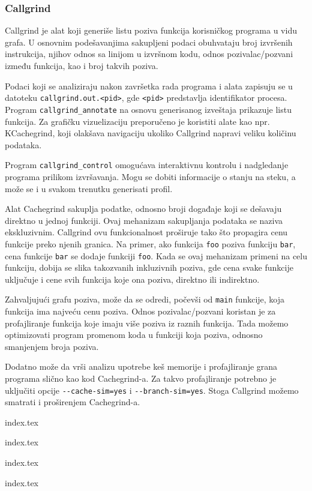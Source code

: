 \subsubsection{Callgrind}\label{callgrind}

Callgrind je alat koji generiše listu poziva funkcija korisničkog programa u vidu grafa. U osnovnim podešavanjima sakupljeni podaci obuhvataju broj izvršenih instrukcija, njihov odnos sa linijom u izvršnom kodu, odnos pozivalac/pozvani između funkcija, kao i broj takvih poziva.

Podaci koji se analiziraju nakon završetka rada programa i alata zapisuju se u datoteku \texttt{callgrind.out.\textless{}pid\textgreater{}}, gde \texttt{\textless{}pid\textgreater{}} predstavlja identifikator procesa. Program \texttt{callgrind\_annotate} na osnovu generisanog izveštaja prikazuje listu funkcija. Za grafičku vizuelizaciju preporučeno je koristiti alate kao npr. KCachegrind, koji olakšava navigaciju ukoliko Callgrind napravi veliku količinu podataka.

Program \texttt{callgrind\_control} omogućava interaktivnu kontrolu i nadgledanje programa prilikom izvršavanja. Mogu se dobiti informacije o stanju na steku, a može se i u svakom trenutku generisati profil.

Alat Cachegrind sakuplja podatke, odnosno broji događaje koji se dešavaju direktno u jednoj funkciji. Ovaj mehanizam sakupljanja podataka se naziva ekskluzivnim. Callgrind ovu funkcionalnost proširuje tako što propagira cenu funkcije preko njenih granica. Na primer, ako funkcija \texttt{foo} poziva funkciju \texttt{bar}, cena funkcije \texttt{bar} se dodaje funkciji \texttt{foo}. Kada se ovaj mehanizam primeni na celu funkciju, dobija se slika takozvanih inkluzivnih poziva, gde cena svake funkcije uključuje i cene svih funkcija koje ona poziva, direktno ili indirektno.

Zahvaljujući grafu poziva, može da se odredi, počevši od \texttt{main} funkcije, koja funkcija ima najveću cenu poziva. Odnos pozivalac/pozvani koristan je za profajliranje funkcija koje imaju više poziva iz raznih funkcija. Tada možemo optimizovati program promenom koda u funkciji koja poziva, odnosno smanjenjem broja poziva.

Dodatno može da vrši analizu upotrebe keš memorije i profajliranje grana programa slično kao kod Cachegrind-a. Za takvo profajliranje potrebno je uključiti opcije \texttt{-\/-cache-sim=yes} i \texttt{-\/-branch-sim=yes}. Stoga Callgrind možemo smatrati i proširenjem Cachegrind-a.

{index.tex}

{index.tex}

{index.tex}

{index.tex}
